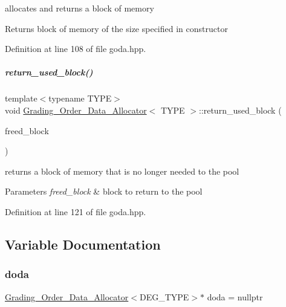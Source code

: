 allocates and returns a block of memory 

\begin{DoxyReturn}{Returns}
block of memory of the size specified in constructor 
\end{DoxyReturn}


Definition at line 108 of file goda.\+hpp.

\mbox{\label{group__memorygroup_a518a8f61da93ea93651f426e12761a07}} 
\subparagraph{\texorpdfstring{return\+\_\+used\+\_\+block()}{return\_used\_block()}}
{\footnotesize\ttfamily template$<$typename T\+Y\+PE$>$ \\
void \hyperlink{group__memorygroup_class_grading___order___data___allocator}{Grading\+\_\+\+Order\+\_\+\+Data\+\_\+\+Allocator}$<$ T\+Y\+PE $>$\+::return\+\_\+used\+\_\+block (\begin{DoxyParamCaption}\item[{T\+Y\+PE $\ast$}]{freed\+\_\+block }\end{DoxyParamCaption})\hspace{0.3cm}{\ttfamily [inline]}}



returns a block of memory that is no longer needed to the pool 


\begin{DoxyParams}{Parameters}
{\em freed\+\_\+block} & block to return to the pool \\
\hline
\end{DoxyParams}


Definition at line 121 of file goda.\+hpp.



\subsection{Variable Documentation}
\mbox{\label{group__memorygroup_gab09a3dd19e9c8880eec08c13bcb42f36}} 
\subsubsection{\texorpdfstring{doda}{doda}}
{\footnotesize\ttfamily \hyperlink{group__memorygroup_class_grading___order___data___allocator}{Grading\+\_\+\+Order\+\_\+\+Data\+\_\+\+Allocator}$<$D\+E\+G\+\_\+\+T\+Y\+PE$>$$\ast$ doda = nullptr}



